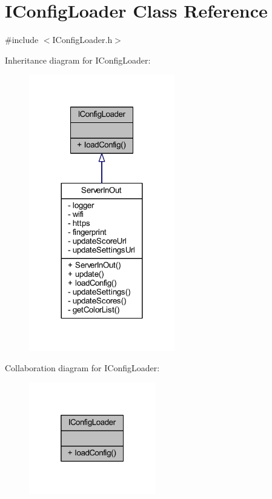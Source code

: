\hypertarget{class_i_config_loader}{}\section{I\+Config\+Loader Class Reference}
\label{class_i_config_loader}


{\ttfamily \#include $<$I\+Config\+Loader.\+h$>$}



Inheritance diagram for I\+Config\+Loader\+:
\nopagebreak
\begin{figure}[H]
\begin{center}
\leavevmode
\includegraphics[width=180pt]{class_i_config_loader__inherit__graph}
\end{center}
\end{figure}


Collaboration diagram for I\+Config\+Loader\+:
\nopagebreak
\begin{figure}[H]
\begin{center}
\leavevmode
\includegraphics[width=157pt]{class_i_config_loader__coll__graph}
\end{center}
\end{figure}
